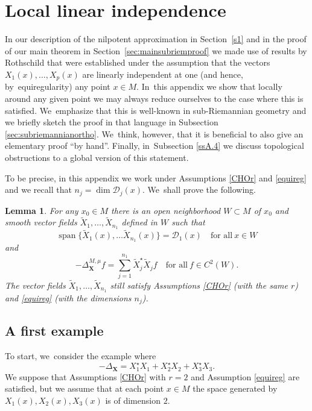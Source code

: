 \documentclass[10pt]{amsart}
\DeclareMathOperator{\Span}{span}
\newcommand{\bX}{{\boldsymbol{X}}}
\newtheorem{lemma}[theorem]{Lemma}
\theoremstyle{definition}
\let\Xb\bX
\newcommand{\1}{\mathbbm{1}}
\begin{document}
\section{Local linear independence}\label{AppA2}

In our description of the nilpotent approximation in Section~\ref{s1} and in the proof of our main theorem in Section~\ref{sec:mainsubriemproof} we made use of results by Rothschild \cite{Rot} that were established under the assumption that the vectors $X_1(x),\ldots,X_p(x)$ are linearly independent at one (and hence, by~equiregularity) any point $x\in M$. In~this appendix we show that locally around any given point we may always reduce ourselves to the case where this is satisfied. We~emphasize that this is well-known in sub-Riemannian geometry and we briefly sketch the proof in that language in Subsection \ref{sec:subriemannianortho}. We~think, however, that it is beneficial to also give an elementary proof ``by hand''. Finally, in~Subsection \ref{ssA.4} we discuss topological obstructions to a global version of this statement.

To be precise, in this appendix we work under Assumptions \ref{CHOr} and \ref{equireg} and we recall that $n_j=\dim\mathcal D_j(x)$. We~shall prove the following.

\begin{lemma}\label{locindep}
For any $x_0\in M$ there is an open neighborhood $W\subset M$ of $x_0$ and smooth vector fields $\tilde X_1,\ldots,\tilde X_{n_1}$ defined in $W$ such that
\begin{equation}
\label{eq:loclinindepapp}
\Span\{ \tilde X_1(x),\ldots \tilde X_{n_1}(x) \} = \mathcal D_1(x)
\quad\text{for all}\ x\in W
\end{equation}
and
\[
-\Delta_\bX^{M,\mu} f = \sum_{j=1}^{n_1} \tilde X_j^\star \tilde X_j f
\quad\text{for all} \ f\in C^2(W).
\]
The vector fields $\tilde X_1,\ldots,\tilde X_{n_1}$ still satisfy Assumptions \ref{CHOr} (with the same $r$) and \ref{equireg} (with the dimensions $n_j$).
\end{lemma}

\subsection{A first example}
To start, we~consider the example where
\[
-\Delta_\Xb = X_1^\star X_1 + X_2^\star X_2 + X_3^\star X_3.
\]
We suppose that Assumptions \ref{CHOr} with $r=2$ and Assumption \ref{equireg} are satisfied, but we assume that at each point $x\in M$ the space generated by $X_1(x), X_2(x), X_3(x)$ is of dimension $2$.
\end{document}
